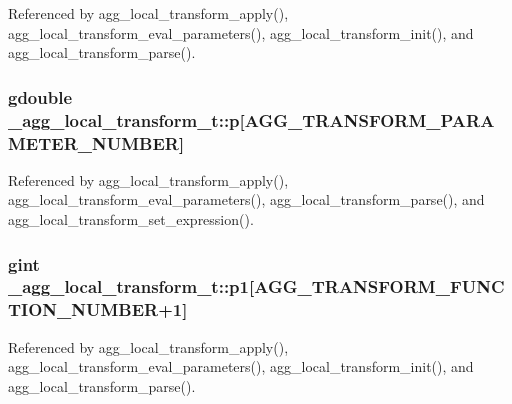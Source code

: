 Referenced by agg\+\_\+local\+\_\+transform\+\_\+apply(), agg\+\_\+local\+\_\+transform\+\_\+eval\+\_\+parameters(), agg\+\_\+local\+\_\+transform\+\_\+init(), and agg\+\_\+local\+\_\+transform\+\_\+parse().

\subsubsection[{p}]{\setlength{\rightskip}{0pt plus 5cm}gdouble \+\_\+agg\+\_\+local\+\_\+transform\+\_\+t\+::p[{\bf A\+G\+G\+\_\+\+T\+R\+A\+N\+S\+F\+O\+R\+M\+\_\+\+P\+A\+R\+A\+M\+E\+T\+E\+R\+\_\+\+N\+U\+M\+B\+E\+R}]}\label{struct__agg__local__transform__t_a8993964d6a3b03e08b6e333603660040}


Referenced by agg\+\_\+local\+\_\+transform\+\_\+apply(), agg\+\_\+local\+\_\+transform\+\_\+eval\+\_\+parameters(), agg\+\_\+local\+\_\+transform\+\_\+parse(), and agg\+\_\+local\+\_\+transform\+\_\+set\+\_\+expression().

\subsubsection[{p1}]{\setlength{\rightskip}{0pt plus 5cm}gint \+\_\+agg\+\_\+local\+\_\+transform\+\_\+t\+::p1[{\bf A\+G\+G\+\_\+\+T\+R\+A\+N\+S\+F\+O\+R\+M\+\_\+\+F\+U\+N\+C\+T\+I\+O\+N\+\_\+\+N\+U\+M\+B\+E\+R}+1]}\label{struct__agg__local__transform__t_a19e7e341d540b5be93f8eb2a0c30b0ab}


Referenced by agg\+\_\+local\+\_\+transform\+\_\+apply(), agg\+\_\+local\+\_\+transform\+\_\+eval\+\_\+parameters(), agg\+\_\+local\+\_\+transform\+\_\+init(), and agg\+\_\+local\+\_\+transform\+\_\+parse().

